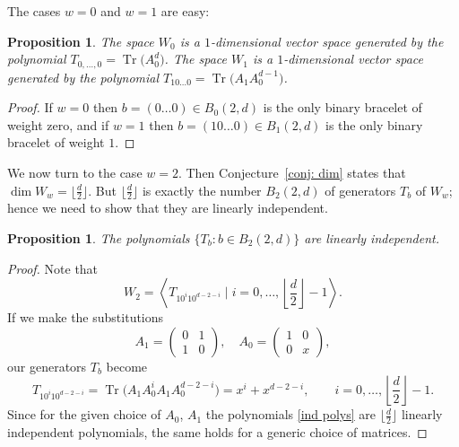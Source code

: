 \documentclass[10pt,a4paper]{amsart}
\numberwithin{equation}{section}
\newtheorem{Proposition}[Theorem]{Proposition}
\DeclareMathOperator{\Tr}{Tr}
\begin{document}
The cases $w=0$ and $w=1$ are easy:
\begin{Proposition}
	The space $W_0$ is a $1$-dimensional vector space generated by the polynomial $T_{0,\dots,0}=\Tr\big(A_{0}^d\big)$.
	The space $W_1$ is a $1$-dimensional vector space generated by the polynomial $T_{10\dots 0}=\Tr\big(A_1A_{0}^{d-1}\big)$.
\end{Proposition}
\begin{proof}
	If $w=0$ then $b=({0\dots 0})\in B_0(2,d)$ is the only binary bracelet of weight zero, and
	if $w=1$ then $b=({10\dots 0})\in B_1(2,d)$ is the only binary bracelet of weight $1$.
\end{proof}
We now turn to the case $w=2$. Then Conjecture~\ref{conj: dim} states that $\dim W_w=\big\lfloor\frac{d}{2}\big\rfloor$. But $\big\lfloor \frac{d}{2}\big\rfloor$ is exactly the number $B_2(2,d)$ of generators $T_b$ of $W_w$; hence we need to show that they are linearly independent.
\begin{Proposition}
	The polynomials $\{T_b \colon b\in B_2(2,d)
	\}$ are linearly independent.
\end{Proposition}
\begin{proof}
	Note that
\[
	W_2= \left\langle T_{10^i10^{d-2-i}} \mid i=0,\dots, \left\lfloor \frac{d}{2}\right\rfloor-1 \right\rangle.
\]
	If we make the substitutions
	\[
	A_1=
	\begin{pmatrix}
	0 & 1 \\
	1 & 0
	\end{pmatrix}, \quad
	A_0=
	\begin{pmatrix}
	1 & 0 \\
	0 & x
	\end{pmatrix},
	\]
	our generators $T_b$ become
	\begin{equation}\label{ind polys}
			T_{10^i10^{d-2-i}}=\Tr\big(A_1A_0^iA_1A_0^{d-2-i}\big)= x^i + x^{d-2-i}, \qquad i=0,\dots,\left\lfloor \frac{d}{2}\right\rfloor-1.
	\end{equation}
	Since for the given choice of $A_0$, $A_1$ the polynomials \eqref{ind polys} are $\big\lfloor \frac{d}{2}\big\rfloor$ linearly independent polynomials, the same holds for a generic choice of matrices.
\end{proof}
\end{document}
